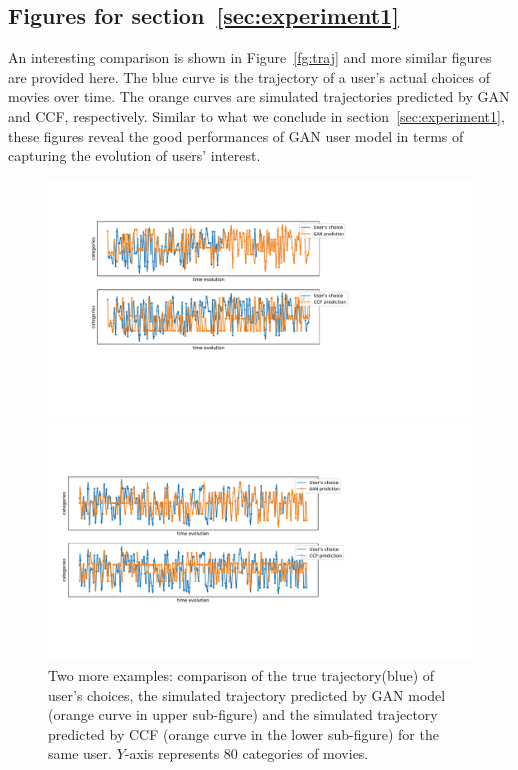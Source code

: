 \documentclass{article} %
\begin{document}
\subsection{Figures for section~\ref{sec:experiment1}}\label{app:exp_usermodel}
An interesting comparison is shown in Figure~\ref{fg:traj} and more similar figures are provided here. The blue curve is the trajectory of a user's actual choices of movies over time. The orange curves are simulated trajectories predicted by {\small GAN} and CCF, respectively. Similar to what we conclude in section~\ref{sec:experiment1}, these figures reveal the good performances of {\small GAN} user model in terms of capturing the evolution of users' interest. 
\begin{figure}[htbp]
  \begin{minipage}[c]{0.47\textwidth}
    \centering
    \includegraphics[width=\textwidth]{user18_new}
  \end{minipage}\hfill
  \begin{minipage}[c]{0.52\textwidth}
    \centering
        \includegraphics[width=\textwidth]{user19_new}
  \end{minipage}
  \caption{\small Two more examples: comparison of the true trajectory(blue) of user's choices, the simulated trajectory predicted by {\small GAN} model (orange curve in upper sub-figure) and the simulated trajectory predicted by CCF (orange curve in the lower sub-figure) for the same user. $Y$-axis represents 80 categories of movies.
    }
\end{figure}
\end{document}
